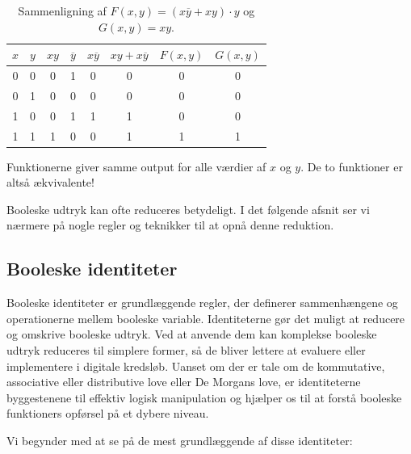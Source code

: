 \begin{table}[h!]
\begin{center}
\renewcommand{\arraystretch}{1.5} %
\begin{tabular}{c|c|c|c|c|c|c|c}
$x$ & $y$ & $xy$ & $\overline{y}$ & $x\overline{y}$ & $xy + x\overline{y}$ & $F(x, y)$ & $G(x, y)$ \\
\hline
0 & 0 & 0 & 1 & 0 & 0 & 0 & 0 \\
\rowcolor{gray!20}
0 & 1 & 0 & 0 & 0 & 0 & 0 & 0 \\
1 & 0 & 0 & 1 & 1 & 1 & 0 & 0 \\
\rowcolor{gray!20}
1 & 1 & 1 & 0 & 0 & 1 & 1 & 1 \\

\end{tabular}
\end{center}
\caption{Sammenligning af \( F(x, y) = (x\overline{y} + xy) \cdot y \) og \( G(x, y) = xy \).}
\label{tab:simplifying_boolean}
\end{table}

Funktionerne giver samme output for alle værdier af \( x \) og \( y \). De to funktioner er altså ækvivalente!

Booleske udtryk kan ofte reduceres betydeligt. I det følgende afsnit ser vi nærmere på nogle regler og teknikker til at opnå denne reduktion.

\subsection*{Booleske identiteter}
Booleske identiteter er grundlæggende regler, der definerer sammenhængene og operationerne mellem booleske variable. Identiteterne gør det muligt at reducere og omskrive booleske udtryk. Ved at anvende dem kan komplekse booleske udtryk reduceres til simplere former, så de bliver lettere at evaluere eller implementere i digitale kredsløb. Uanset om der er tale om de kommutative, associative eller distributive love eller De Morgans love, er identiteterne byggestenene til effektiv logisk manipulation og hjælper os til at forstå booleske funktioners opførsel på et dybere niveau.

Vi begynder med at se på de mest grundlæggende af disse identiteter:

